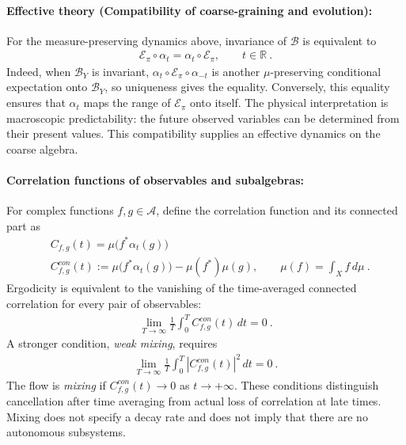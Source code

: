 \documentclass[a4paper,11pt]{article}
\theoremstyle{definition}
\newcommand{\mA}{\mathcal{A}}
\newcommand{\mB}{\mathcal{B}}
\newcommand{\nn}{\nonumber}
\newcommand{\mE}{\mathcal{E}}
\begin{document}

\paragraph{Effective theory (Compatibility of coarse-graining and evolution):}
For the measure-preserving dynamics above, invariance of $\mB$ is equivalent to
\begin{align}\label{eq:classical-expectation-equivariance}
    \mE_{\pi}\circ\alpha_t=\alpha_t\circ \mE_{\pi},
    \qquad t\in\mathbb R\ .
\end{align}
Indeed, when $\mB_Y$ is invariant, $\alpha_t\circ \mE_{\pi}\circ\alpha_{-t}$ is another $\mu$-preserving conditional expectation onto $\mB_Y$, so uniqueness gives the equality. Conversely, this equality ensures that $\alpha_t$ maps the range of $\mE_{\pi}$ onto itself. The physical interpretation is macroscopic predictability: the future observed variables can be determined from their present values. This compatibility supplies an effective dynamics on the coarse algebra.


\paragraph{Correlation functions of observables and subalgebras:}
For complex functions $f,g\in\mA$, define the correlation function and its connected part as
\begin{align}
    &C_{f,g}(t)=\mu\bigl(f^*\alpha_t(g)\bigr)\nn\\
    &C^{con}_{f,g}(t)
    :=\mu\bigl(f^*\alpha_t(g)\bigr)-\mu(f^*)\mu(g),
    \qquad \mu(f)=\int_X f\,d\mu\ .
\end{align}
Ergodicity is equivalent to the vanishing of the time-averaged connected correlation for every pair of observables:
\begin{align}
    \lim_{T\to\infty}\frac{1}{T}\int_0^T C^{con}_{f,g}(t)\,dt=0\ .
\end{align}
A stronger condition, {\it weak mixing}, requires
\begin{align}
    \lim_{T\to\infty}\frac{1}{T}\int_0^T |C^{con}_{f,g}(t)|^2\,dt=0\ .
\end{align}
The flow is {\it mixing} if $C^{con}_{f,g}(t)\to0$ as $t\to+\infty$. These conditions distinguish cancellation after time averaging from actual loss of correlation at late times. Mixing does not specify a decay rate and does not imply that there are no autonomous subsystems.
\end{document}
